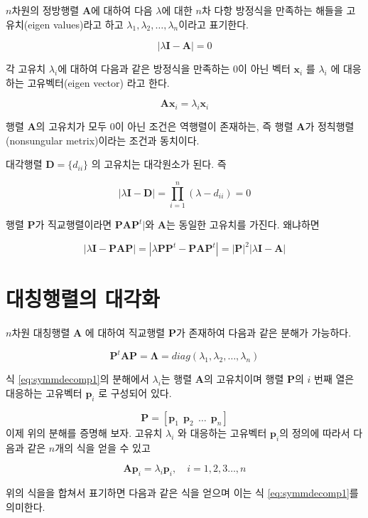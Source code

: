 \documentclass[
]{book}
\newcommand{\bm}[1]{\boldsymbol{\mathbf{#1}}}
\theoremstyle{definition}
\theoremstyle{definition}
\theoremstyle{definition}
\theoremstyle{definition}
\theoremstyle{remark}
\begin{document}
\(n\)차원의 정방행렬 \(\bm A\)에 대하여 다음 \(\lambda\)에 대한 \(n\)차 다항 방정식을 만족하는 해들을 고유치(eigen values)라고 하고 \(\lambda_1, \lambda_2, \dots , \lambda_n\)이라고 표기한다.

\[ | \lambda \bm I - \bm A | = 0 \]

각 고유치 \(\lambda_i\)에 대하여 다음과 같은 방정식을 만족하는 0이 아닌 벡터 \(\bm x_i\) 를 \(\lambda_i\) 에 대응하는 고유벡터(eigen vector) 라고 한다.

\[ \bm A \bm x_i = \lambda_i \bm x_i \]

행렬 \(\bm A\)의 고유치가 모두 0이 아닌 조건은 역행렬이 존재하는, 즉 행렬 \(\bm A\)가 정칙행렬(nonsungular metrix)이라는 조건과 동치이다.

대각행렬 \(\bm D = \{ d_{ii} \}\) 의 고유치는 대각원소가 된다. 즉

\[ | \lambda \bm I - \bm D | = \prod_{i=1}^n (\lambda - d_{ii}) =0 \]

행렬 \(\bm P\)가 직교행렬이라면 \(\bm P \bm A \bm P^t|\)와 \(\bm A\)는 동일한 고유치를 가진다. 왜냐하면

\[ | \lambda \bm I - \bm P \bm A \bm P | = |\lambda \bm P \bm P^t - \bm P \bm A \bm P^t| = |\bm P|^2 | \lambda \bm I - \bm A | \]

\hypertarget{uxb300uxce6duxd589uxb82cuxc758-uxb300uxac01uxd654}{%
\section{대칭행렬의 대각화}\label{uxb300uxce6duxd589uxb82cuxc758-uxb300uxac01uxd654}}

\(n\)차원 대칭행렬 \(\bm A\) 에 대하여 직교행렬 \(\bm P\)가 존재하여 다음과 같은 분해가 가능하다.

\begin{equation}
 \bm P^t \bm A \bm P = \bm \Lambda = diag(\lambda_1, \lambda_2, \dots, \lambda_n) 
 \label{eq:symmdecomp1}
\end{equation}

식 \eqref{eq:symmdecomp1}의 분해에서 \(\lambda_i\)는 행렬 \(\bm A\)의 고유치이며 행렬 \(\bm P\)의 \(i\) 번째 열은 대응하는 고유벡터 \(\bm p_i\) 로 구성되어 있다.

\[ \bm P = [ \bm p_1~~ \bm p_2 ~~ \dots ~~ \bm p_n ] \]
이제 위의 분해를 증명해 보자. 고유치 \(\lambda_i\) 와 대응하는 고유벡터 \(\bm p_i\)의 정의에 따라서 다음과 같은 \(n\)개의 식을 얻을 수 있고

\[ \bm A \bm p_i = \lambda_i \bm p_i , \quad i=1,2,3\dots, n \]

위의 식을을 합쳐서 표기하면 다음과 같은 식을 얻으며 이는 식 \eqref{eq:symmdecomp1}를 의미한다.
\end{document}
